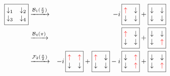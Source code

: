 \documentclass[prl,aps,twocolumn,showpacs,superscriptaddress,longbibliography]{revtex4-1}
\begin{document}
\begin{eqnarray}
%
\boxed{
\begin{matrix}
  \downarrow_1 & \downarrow_2 \\
  \downarrow_3 & \downarrow_4
 \end{matrix}
}
	& \xrightarrow[]{\mathcal{B}_1(\frac{\pi}{2})} &
-i \, \boxed{
\begin{matrix}
  {\color{red} \uparrow} & \downarrow \\
  \downarrow & \downarrow
 \end{matrix}
}
+
\boxed{
\begin{matrix}
  \downarrow & \downarrow \\
  \downarrow & \downarrow
 \end{matrix}
} 
\nonumber \\
	& \xrightarrow[]{\mathcal{B}_4(\pi)} &
\phantom{-i \,} \boxed{
\begin{matrix}
  {\color{red} \uparrow} & \downarrow \\
  \downarrow & \downarrow
 \end{matrix}
}
+
\boxed{
\begin{matrix}
  \downarrow & \downarrow \\
  \downarrow & {\color{red} \uparrow}
 \end{matrix}
} 
\nonumber \\
	& \xrightarrow[]{\mathcal{F}_2(\frac{\pi}{2})} &
-i\,\boxed{
\begin{matrix}
  {\color{red} \uparrow} & {\color{red} \uparrow} \\
  \downarrow & \downarrow
 \end{matrix}
}
+
\boxed{
\begin{matrix}
  {\color{red} \uparrow} & \downarrow \\
  \downarrow & \downarrow
 \end{matrix}
}
-i\,\boxed{
\begin{matrix}
  \downarrow & {\color{red} \uparrow} \\
  \downarrow & {\color{red} \uparrow}
 \end{matrix}
}
+
\boxed{
\begin{matrix}
  \downarrow & \downarrow \\
  \downarrow & {\color{red} \uparrow}
 \end{matrix}
} 
\nonumber \\

\end{eqnarray}
\end{document}
